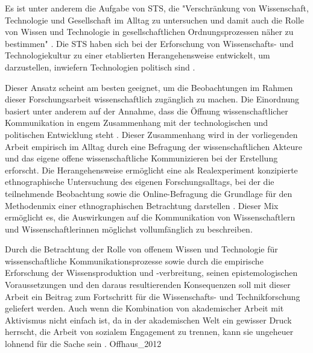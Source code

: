 Es ist unter anderem die Aufgabe von STS, die "Verschränkung von Wissenschaft, Technologie und Gesellschaft im Alltag zu untersuchen und damit auch die Rolle von Wissen und Technologie in gesellschaftlichen Ordnungsprozessen näher zu bestimmen" \cite{beck_2014_science}. Die STS haben sich bei der Erforschung von Wissenschafts- und Technologiekultur zu einer etablierten Herangehensweise entwickelt, um darzustellen, inwiefern Technologien politisch sind \cite{Kelty_2014}.

Dieser Ansatz scheint am besten geeignet, um die Beobachtungen im Rahmen dieser Forschungsarbeit wissenschaftlich zugänglich zu machen. Die Einordnung basiert unter anderem auf der Annahme, dass die Öffnung wissenschaftlicher Kommunikation in engem Zusammenhang mit der technologischen und politischen Entwicklung steht \cite{Weingart_2005}. Dieser Zusammenhang wird in der vorliegenden Arbeit empirisch im Alltag durch eine Befragung der wissenschaftlichen Akteure und das eigene offene wissenschaftliche Kommunizieren bei der Erstellung erforscht. Die Herangehensweise ermöglicht eine als Realexperiment konzipierte ethnographische Untersuchung des eigenen Forschungsalltags, bei der die teilnehmende Beobachtung sowie die Online-Befragung die Grundlage für den Methodenmix einer ethnographischen Betrachtung darstellen \cite{bachmann_2011_ethnographie}. Dieser Mix ermöglicht es, die Auswirkungen auf die Kommunikation von Wissenschaftlern und Wissenschaftlerinnen möglichst vollumfänglich zu beschreiben.

Durch die Betrachtung der Rolle von offenem Wissen und Technologie für wissenschaftliche Kommunikationsprozesse sowie durch die empirische Erforschung der Wissensproduktion und -verbreitung, seinen epistemologischen Voraussetzungen und den daraus resultierenden Konsequenzen \cite{beck_2014_science} soll mit dieser Arbeit ein Beitrag zum Fortschritt für die Wissenschafts- und Technikforschung geliefert werden. Auch wenn die Kombination von akademischer Arbeit mit Aktivismus nicht einfach ist, da in der akademischen Welt ein gewisser Druck herrscht, die Arbeit von sozialem Engagement zu trennen, kann sie ungeheuer lohnend für die Sache sein \cite[:25]{Flood_2013}.
Offhaus_2012
